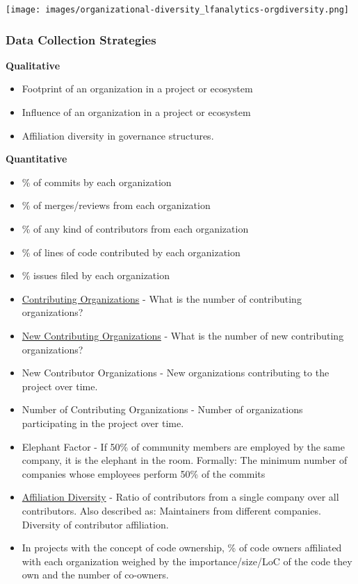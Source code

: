 \documentclass[
  12pt,
]{article}
\providecommand{\tightlist}{%
  \setlength{\itemsep}{0pt}\setlength{\parskip}{0pt}}
\begin{document}
\texttt{[image: images/organizational-diversity\_lfanalytics-orgdiversity.png]}

\hypertarget{data-collection-strategies-6}{%
\subsubsection{Data Collection
Strategies}\label{data-collection-strategies-6}}

\textbf{Qualitative}

\begin{itemize}
\tightlist
\item
  Footprint of an organization in a project or ecosystem
\item
  Influence of an organization in a project or ecosystem
\item
  Affiliation diversity in governance structures.
\end{itemize}

\textbf{Quantitative}

\begin{itemize}
\tightlist
\item
  \% of commits by each organization
\item
  \% of merges/reviews from each organization
\item
  \% of any kind of contributors from each organization
\item
  \% of lines of code contributed by each organization
\item
  \% issues filed by each organization
\item
  \href{https://github.com/chaoss/metrics/blob/master/activity-metrics/contributing-organizations.md}{Contributing
  Organizations} - What is the number of contributing organizations?
\item
  \href{https://github.com/chaoss/metrics/blob/master/activity-metrics/new-contributing-organizations.md}{New
  Contributing Organizations} - What is the number of new contributing
  organizations?
\item
  New Contributor Organizations - New organizations contributing to the
  project over time.
\item
  Number of Contributing Organizations - Number of organizations
  participating in the project over time.
\item
  Elephant Factor - If 50\% of community members are employed by the
  same company, it is the elephant in the room. Formally: The minimum
  number of companies whose employees perform 50\% of the commits
\item
  \href{https://github.com/chaoss/metrics/blob/master/activity-metrics/contributor-diversity.md}{Affiliation
  Diversity} - Ratio of contributors from a single company over all
  contributors. Also described as: Maintainers from different companies.
  Diversity of contributor affiliation.
\item
  In projects with the concept of code ownership, \% of code owners
  affiliated with each organization weighed by the importance/size/LoC
  of the code they own and the number of co-owners.
\end{itemize}
\end{document}
